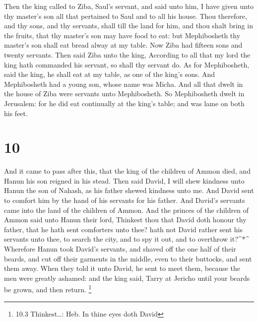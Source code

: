  Then the king called to Ziba, Saul's servant, and said unto
him, I have given unto thy master's son all that pertained to Saul and
to all his house.  Thou therefore, and thy sons, and thy
servants, shall till the land for him, and thou shalt bring in the
fruits, that thy master's son may have food to eat: but Mephibosheth thy
master's son shall eat bread alway at my table. Now Ziba had fifteen
sons and twenty servants.  Then said Ziba unto the king,
According to all that my lord the king hath commanded his servant, so
shall thy servant do. As for Mephibosheth, said the king, he shall eat
at my table, as one of the king's sons.  And Mephibosheth
had a young son, whose name was Micha. And all that dwelt in the house
of Ziba were servants unto Mephibosheth.  So Mephibosheth
dwelt in Jerusalem: for he did eat continually at the king's table; and
was lame on both his feet.

\hypertarget{section-9}{%
\section{10}\label{section-9}}

 And it came to pass after this, that the king of the
children of Ammon died, and Hanun his son reigned in his stead.
 Then said David, I will shew kindness unto Hanun the son of
Nahash, as his father shewed kindness unto me. And David sent to comfort
him by the hand of his servants for his father. And David's servants
came into the land of the children of Ammon.  And the
princes of the children of Ammon said unto Hanun their lord, Thinkest
thou that David doth honour thy father, that he hath sent comforters
unto thee? hath not David rather sent his servants unto thee, to search
the city, and to spy it out, and to overthrow it?\^{}*\^{} 
Wherefore Hanun took David's servants, and shaved off the one half of
their beards, and cut off their garments in the middle, even to their
buttocks, and sent them away.  When they told it unto David,
he sent to meet them, because the men were greatly ashamed: and the king
said, Tarry at Jericho until your beards be grown, and then return.
\footnote{10.3 Thinkest\ldots: Heb. In thine eyes doth David}

